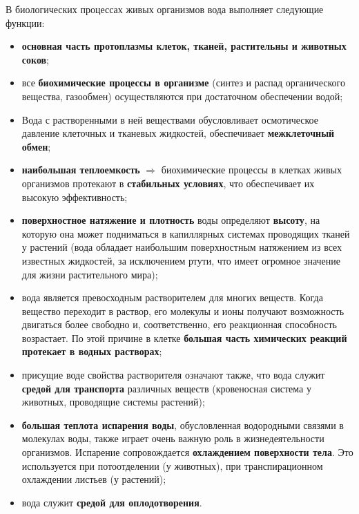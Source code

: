 \documentclass{bmstu}
\begin{document}
В биологических процессах живых организмов вода выполняет следующие функции:

\begin{itemize}
    \item \textbf{основная часть протоплазмы клеток, тканей, растительны и
        животных соков};
    \item все \textbf{биохимические процессы в организме} (синтез и распад органического
        вещества, газообмен) осуществляются при достаточном обеспечении водой;
    \item Вода с растворенными в ней веществами обусловливает осмотическое
        давление клеточных и тканевых жидкостей, обеспечивает
        \textbf{межклеточный обмен};
    \item \textbf{наибольшая теплоемкость} $\Rightarrow$ биохимические процессы в
        клетках живых организмов протекают в \textbf{стабильных условиях}, что
        обеспечивает их высокую эффективность;
    \item \textbf{поверхностное натяжение и плотность} воды определяют
        \textbf{высоту}, на которую она может подниматься в капиллярных системах
        проводящих тканей у растений (вода обладает наибольшим поверхностным
        натяжением из всех известных жидкостей, за исключением ртути, что имеет
        огромное значение для жизни растительного мира);
    \item вода является превосходным растворителем для многих веществ. Когда
        вещество переходит в раствор, его молекулы и ионы получают возможность
        двигаться более свободно и, соответственно, его реакционная способность
        возрастает. По этой причине в клетке \textbf{большая часть химических
            реакций протекает в водных растворах};
    \item присущие воде свойства растворителя означают также, что вода служит
        \textbf{средой для транспорта} различных веществ (кровеносная система у
        животных, проводящие системы растений);
    \item \textbf{большая теплота испарения воды}, обусловленная водородными
        связями в молекулах воды, также играет очень важную роль в
        жизнедеятельности организмов. Испарение сопровождается
        \textbf{охлаждением поверхности тела}. Это используется при
        потоотделении (у животных), при транспирационном охлаждении листьев (у
        растений);
    \item вода служит \textbf{средой для оплодотворения}.
\end{itemize}
\end{document}
